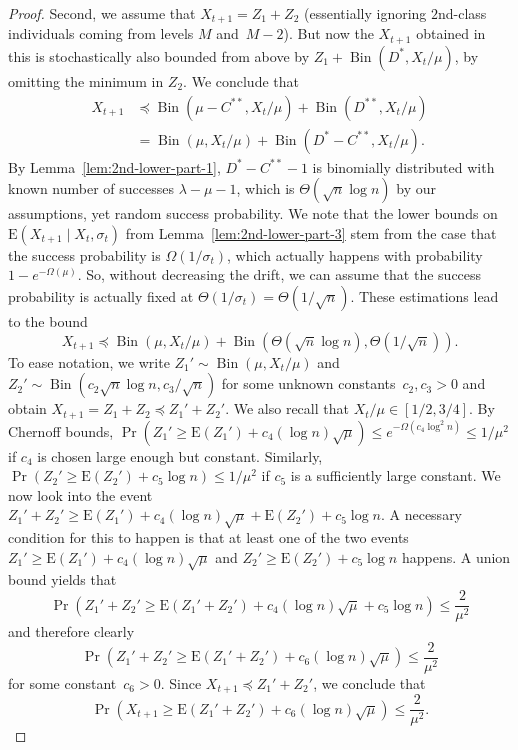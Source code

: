 \documentclass[11pt, a4paper]{article}
\DeclareMathOperator{\Prob}{Pr}
\newcommand*{\E}{\mathrm{E}}
\newcommand{\indic}[1]{\mathds{1}\{#1\}}
\DeclareMathOperator{\Bin}{Bin}
\begin{document}
\begin{proof}
Second, we assume that $X_{t+1} = Z_1+Z_2$ 
 (essentially ignoring $2$nd-class individuals coming from levels 
$M$ and~$M-2$). But now the $X_{t+1}$ obtained in this 
is stochastically also bounded from above by 
$Z_1+\Bin(D^*,X_t/\mu)$, by omitting the minimum in $Z_2$. We conclude that 
\begin{align*}
X_{t+1} & \preceq \Bin(\mu-C^{**},X_t/\mu) + \Bin(D^{**},X_t/\mu) \\
&  = \Bin(\mu,X_t/\mu) + 
\Bin(D^{*}-C^{**},X_t/\mu).
\end{align*}
By Lemma~\ref{lem:2nd-lower-part-1}, $D^*-C^{**}-1$ is binomially 
distributed with known number of successes $\lambda-\mu-1$, which is $\Theta(\sqrt{n}\log n)$ by our assumptions, 
yet random success probability. We note 
that the lower bounds on $\E(X_{t+1}\mid X_t,\sigma_t)$ from Lemma~\ref{lem:2nd-lower-part-3} stem from the case 
that the success probability is $\Omega(1/\sigma_t)$, which actually happens 
with probability $1-e^{-\Omega(\mu)}$. So, without decreasing the drift, 
we can assume that the success probability 
is actually fixed at $\Theta(1/\sigma_t)=\Theta(1/\sqrt{n})$.
These estimations  lead to the bound 
\[
X_{t+1} \preceq \Bin(\mu,X_t/\mu) + 
\Bin(\Theta(\sqrt{n}\log n),\Theta(1/\sqrt{n})).
\]
To ease notation, we write $Z_1'\sim \Bin(\mu,X_t/\mu)$ and  
$Z_2'\sim \Bin(c_2\sqrt{n}\log n,c_3/\sqrt{n})$ for some 
unknown constants~$c_2,c_3>0$ and obtain $X_{t+1} = Z_1+Z_2\preceq Z_1'+Z_2'$. 
We also recall that $X_t/\mu\in[1/2,3/4]$. 
By Chernoff bounds, $\Prob(Z_1'\ge \E(Z_1')+c_4(\log n)\sqrt{\mu})\le e^{-\Omega(c_4\log^2 n)}\le 1/\mu^2$ 
if $c_4$ is chosen large enough but constant.  
Similarly, $\Prob(Z_2'\ge \E(Z_2')+c_5\log n)\le 1/\mu^2$ if $c_5$ is a sufficiently large constant.
We now look into the event $Z_1'+Z_2' \ge \E(Z_1')+c_4(\log n)\sqrt{\mu} + \E(Z_2')+c_5\log n$. A necessary 
condition for this to happen is that at least one of the two events  $Z_1'\ge \E(Z_1')+c_4(\log n)\sqrt{\mu}$ and 
$Z_2'\ge \E(Z_2')+c_5\log n$ happens. A union bound yields that 
\[
\Prob(Z_1'+Z_2' \ge \E(Z_1'+Z_2')+c_4(\log n)\sqrt{\mu}+c_5\log n ) \le \frac{2}{\mu^2}
\]
and therefore clearly 
\[
\Prob(Z_1'+Z_2' \ge \E(Z_1'+Z_2')+c_6(\log n)\sqrt{\mu}) \le \frac{2}{\mu^2}
\]
for some constant~$c_6>0$. Since $X_{t+1}\preceq Z_1'+Z_2'$, we conclude that 
\[
\Prob(X_{t+1} \ge \E(Z_1'+Z_2')+c_6(\log n)\sqrt{\mu}) \le \frac{2}{\mu^2}.
\]


\end{proof}
\end{document}
